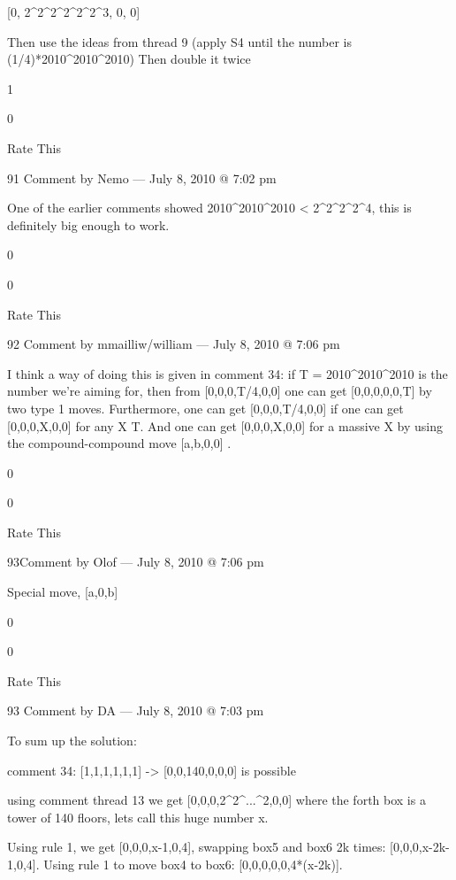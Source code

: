 {        [0, 2^2^2^2^2^2^3, 0, 0]

        Then use the ideas from thread 9 (apply S4 until the number is (1/4)*2010^2010^2010)
        Then double it twice
         
        1
         
        0
         
        Rate This

        91 Comment by Nemo — July 8, 2010 @ 7:02 pm

            One of the earlier comments showed 2010^2010^2010 < 2^2^2^2^4, this is definitely big enough to work.
             
            0
             
            0
             
            Rate This

            92 Comment by mmailliw/william — July 8, 2010 @ 7:06 pm

        I think a way of doing this is given in comment 34: if T = 2010^{2010^{2010}} is the number we’re aiming for, then from [0,0,0,T/4,0,0] one can get [0,0,0,0,0,T] by two type 1 moves. Furthermore, one can get [0,0,0,T/4,0,0] if one can get [0,0,0,X,0,0] for any X \geq T. And one can get [0,0,0,X,0,0] for a massive X by using the compound-compound move [a,b,0,0] \to [a-2, 2^{b+2}, 0, 0].
         
        0
         
        0
         
        Rate This

        93Comment by Olof — July 8, 2010 @ 7:06 pm

    Special move, [a,0,b]\rightarrow [0,0,b \times 2^a]
     
    0
     
    0
     
    Rate This

    93 Comment by DA — July 8, 2010 @ 7:03 pm

    To sum up the solution:

    comment 34: [1,1,1,1,1,1] -> [0,0,140,0,0,0] is possible

    using comment thread 13 we get [0,0,0,2^2^...^2,0,0] where the
    forth box is a tower of 140 floors, lets call this huge number x.

    Using rule 1, we get [0,0,0,x-1,0,4], swapping box5 and box6 2k
    times: [0,0,0,x-2k-1,0,4]. Using rule 1 to move box4 to box6:
    [0,0,0,0,0,4*(x-2k)].

}

